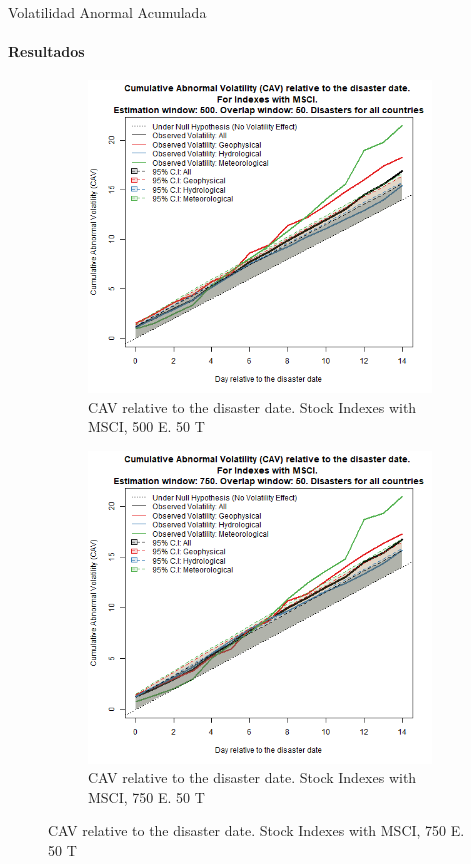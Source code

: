 \documentclass{beamer}
\begin{document}
\begin{frame}{Volatilidad Anormal Acumulada}
\framesubtitle{Resultados}
\begin{figure}
    \begin{subfigure}{0.5\textwidth}
        \includegraphics[width=0.9\linewidth]{../Graficos_Paper/CAV/Ag//indices_benchmark_CAV_Est_500_tra_50.png}
        \caption{CAV relative to the disaster date. Stock Indexes with MSCI, 500 E. 50 T}
        \label{figure:cavind50050}
    \end{subfigure}%
    \begin{subfigure}{0.5\textwidth}
        \includegraphics[width=0.9\linewidth]{../Graficos_Paper/CAV/Ag//indices_benchmark_CAV_Est_750_tra_50.png}
        \caption{CAV relative to the disaster date. Stock Indexes with MSCI, 750 E. 50 T}
        \label{figure:cavind75050}
    \end{subfigure}
\end{figure}
\end{frame}
\end{document}
